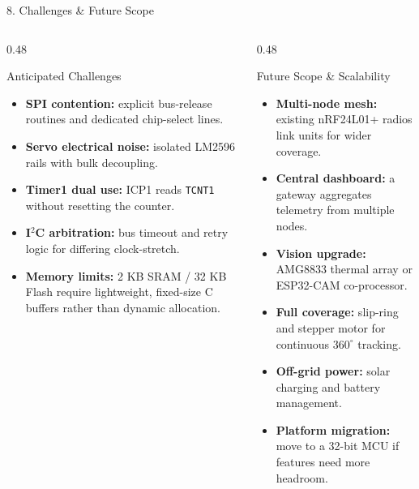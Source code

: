 \documentclass[aspectratio=169, 10pt]{beamer}
\begin{document}
\begin{frame}{8. Challenges \& Future Scope}
    \begin{columns}[T]
        \begin{column}{0.48\textwidth}
            \begin{block}{Anticipated Challenges}
                \footnotesize
                \begin{itemize}
                    \item \textbf{SPI contention:} explicit bus-release routines and dedicated chip-select lines.
                    \item \textbf{Servo electrical noise:} isolated LM2596 rails with bulk decoupling.
                    \item \textbf{Timer1 dual use:} ICP1 reads \texttt{TCNT1} without resetting the counter.
                    \item \textbf{I$^2$C arbitration:} bus timeout and retry logic for differing clock-stretch.
                    \item \textbf{Memory limits:} 2 KB SRAM / 32 KB Flash require lightweight, fixed-size C buffers rather than dynamic allocation.
                \end{itemize}
            \end{block}
        \end{column}
        \begin{column}{0.48\textwidth}
            \begin{block}{Future Scope \& Scalability}
                \footnotesize
                \begin{itemize}
                    \item \textbf{Multi-node mesh:} existing nRF24L01+ radios link units for wider coverage.
                    \item \textbf{Central dashboard:} a gateway aggregates telemetry from multiple nodes.
                    \item \textbf{Vision upgrade:} AMG8833 thermal array or ESP32-CAM co-processor.
                    \item \textbf{Full coverage:} slip-ring and stepper motor for continuous $360^\circ$ tracking.
                    \item \textbf{Off-grid power:} solar charging and battery management.
                    \item \textbf{Platform migration:} move to a 32-bit MCU if features need more headroom.
                \end{itemize}
            \end{block}
        \end{column}
    \end{columns}
\end{frame}
\end{document}
